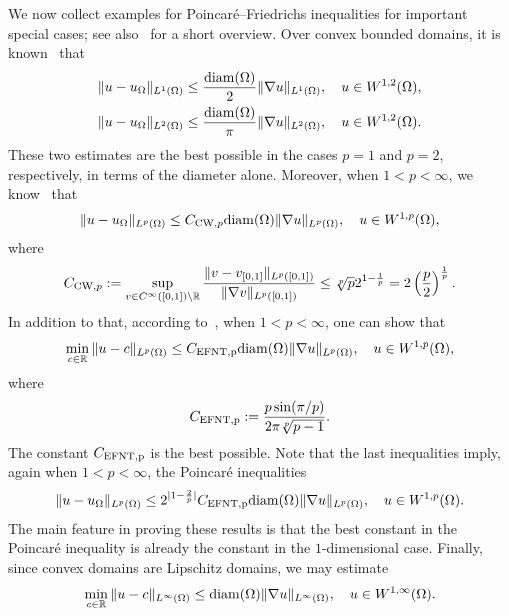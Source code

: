 \documentclass[a4paper]{article}
\begin{document}
We now collect examples for Poincar\'e--Friedrichs inequalities for important special cases; see also~\cite[Lemma~3.24]{ern2021finite} for a short overview. Over convex bounded domains, it is known~\cite{bebendorf2003note,acosta2004optimal} that 
\begin{align}\label{math:acostaduran}
    \| u - u_{\Omega} \|_{L^{1}(\Omega)}
    \leq 
    \frac{{\operatorname{diam}}(\Omega)}{2}
    \| \nabla u \|_{L^{1}(\Omega)}
    ,
    \quad 
    u \in W^{1,2}(\Omega)
    ,
    \\
    \| u - u_{\Omega} \|_{L^{2}(\Omega)} \label{math:bebendorf}
    \leq 
    \frac{{\operatorname{diam}}(\Omega)}{\pi}
    \| \nabla u \|_{L^{2}(\Omega)}
    ,
    \quad 
    u \in W^{1,2}(\Omega)
    .
\end{align}
These two estimates are the best possible in the cases $p=1$ and $p=2$, respectively, in terms of the diameter alone. 
Moreover, when $1 < p < \infty$, we know~\cite{chua2006estimates} that
\begin{align}\label{math:chuawheeden}
    \| u - u_{\Omega} \|_{L^{p}(\Omega)}
    \leq 
    C_{{\rm CW},p}
    {\operatorname{diam}}(\Omega)
    \| \nabla u \|_{L^{p}(\Omega)}
    ,
    \quad 
    u \in W^{1,p}(\Omega)
    ,
\end{align}
where 
\begin{align}
    C_{{\rm CW},p} 
    := 
    \sup\limits_{ v \in C^\infty([0,1]) \setminus {\mathbb R} } 
    \frac{ 
        \| v - v_{[0,1]} \|_{L^{p}([0,1])} 
    }{ 
        \| \nabla v \|_{L^{p}([0,1])} 
    }
    \leq 
    \sqrt[p]{p} 2^{1-\frac 1 p}
    =
    2
    \left( \frac p 2 \right)^{\frac 1 p}
    .
\end{align}
In addition to that,
according to~\cite{ferone2012remark,esposito2013poincare}, when $1 < p < \infty$, one can show that 
\begin{align}\label{math:esposito:pf}
    \min\limits_{ c \in {\mathbb R} }
    \| u - c \|_{L^{p}(\Omega)}
    \leq 
    C_{\rm{EFNT},p}
    {\operatorname{diam}}(\Omega)
    \| \nabla u \|_{L^{p}(\Omega)}
    ,
    \quad 
    u \in W^{1,p}(\Omega)
    ,
\end{align}
where 
\begin{align}
    C_{\rm{EFNT},p}
    :=
    \frac{ p \sin(\pi/p) }{ 2\pi \sqrt[p]{p-1} }
    .
\end{align}
The constant $C_{\rm{EFNT},p}$ is the best possible. 
Note that the last inequalities imply, again when $1 < p < \infty$, the Poincar\'e inequalities
\begin{align}\label{math:esposito:poincare}
    \| u - u_{\Omega} \|_{L^{p}(\Omega)}
    \leq 
    2^{|1-\frac 2 p|}C_{\rm{EFNT},p}
    {\operatorname{diam}}(\Omega)
    \| \nabla u \|_{L^{p}(\Omega)}
    ,
    \quad 
    u \in W^{1,p}(\Omega)
    .
\end{align}
The main feature in proving these results is that the best constant in the Poincar\'e inequality is already the constant in the $1$-dimensional case. 
Finally,
since convex domains are Lipschitz domains, we may estimate 
\begin{align}\label{math:lipschitzestimate}
    \min\limits_{ c \in {\mathbb R} }
    \| u - c \|_{L^{\infty}(\Omega)}
    \leq 
    {\operatorname{diam}}(\Omega)
    \| \nabla u \|_{L^{\infty}(\Omega)}
    ,
    \quad 
    u \in W^{1,\infty}(\Omega)
    .
\end{align}
\end{document}
